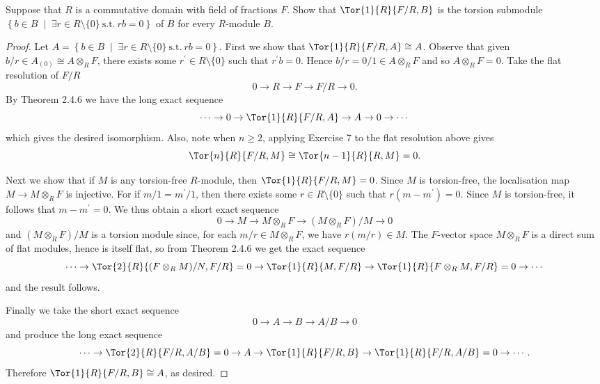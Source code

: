 \documentclass[10pt]{amsart}
\begin{document}
\begin{ex}
  Suppose that $R$ is a commutative domain with field of fractions $F$.
  Show that $\Tor{1}{R}{F/R, B}$ is the torsion submodule $\left\{b \in B \;\middle\vert\; \exists r \in R\setminus\{0\}\ \text{s.t.}\ rb = 0\right\}$ of $B$ for every $R$-module $B$.

  \begin{proof}
    Let $A = \left\{b \in B \;\middle\vert\; \exists r \in R\setminus\{0\}\ \text{s.t.}\ rb = 0\right\}$.
    First we show that $\Tor{1}{R}{F/R, A} \cong A$.
    Observe that given $b/r \in A_{(0)} \cong A \otimes_R F$, there exists some $r^\prime \in R\setminus\{0\}$ such that $r^\prime b = 0$.
    Hence $b/r = 0/1 \in A \otimes_R F$ and so $A \otimes_R F = 0$.
    Take the flat resolution of $F/R$
    $$0 \rightarrow R \rightarrow F \rightarrow F/R \rightarrow 0.$$
    By Theorem 2.4.6 we have the long exact sequence
    $$\cdots \rightarrow 0 \rightarrow \Tor{1}{R}{F/R, A} \rightarrow A \rightarrow 0 \rightarrow \cdots$$
    which gives the desired isomorphism.
    Also, note when $n \geq 2$, applying Exercise 7 to the flat resolution above gives
    $$\Tor{n}{R}{F/R, M} \cong \Tor{n-1}{R}{R,M} = 0.$$
    
    Next we show that if $M$ is any torsion-free $R$-module, then $\Tor{1}{R}{F/R, M} = 0$.
    Since $M$ is torsion-free, the localisation map $M \rightarrow M \otimes_R F$ is injective.
    For if $m/1 = m^\prime/1$, then there exists some $r \in R\setminus\{0\}$ such that $r(m - m^\prime) = 0$.
    Since $M$ is torsion-free, it follows that $m - m^\prime = 0$.
    We thus obtain a short exact sequence
    $$0 \rightarrow M \rightarrow M \otimes_R F \rightarrow (M \otimes_R F)/M \rightarrow 0$$
    and $(M \otimes_R F)/M$ is a torsion module since, for each $m/r \in M \otimes_R F$, we have $r (m/r) \in M$.
    The $F$-vector space $M \otimes_R F$ is a direct sum of flat modules, hence is itself flat, so from Theorem 2.4.6 we get the exact sequence
    $$\cdots \rightarrow \Tor{2}{R}{(F \otimes_R M) / N, F/R} = 0 \rightarrow \Tor{1}{R}{M, F/R} \rightarrow \Tor{1}{R}{F \otimes_R M, F/R} = 0 \rightarrow \cdots$$
    and the result follows.
    
    Finally we take the short exact sequence
    $$0 \rightarrow A \rightarrow B \rightarrow A/B \rightarrow 0$$
    and produce the long exact sequence
    $$\cdots \rightarrow \Tor{2}{R}{F/R, A/B} = 0 \rightarrow A \rightarrow \Tor{1}{R}{F/R,B} \rightarrow \Tor{1}{R}{F/R, A/B} = 0 \rightarrow \cdots.$$
    Therefore $\Tor{1}{R}{F/R,B} \cong A$, as desired.
  \end{proof}
\end{ex}
\end{document}

